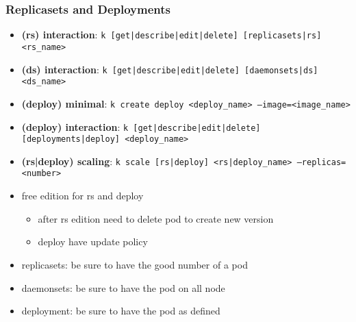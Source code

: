 \subsubsection{Replicasets and Deployments}
\begin{frame}[fragile]{\subsubsecname}

  \begin{itemize}
    \item \textbf{(rs) interaction}: \texttt{k [get|describe|edit|delete] [replicasets|rs] <rs\_name>}
    \item \textbf{(ds) interaction}: \texttt{k [get|describe|edit|delete] [daemonsets|ds] <ds\_name>}
    \item \textbf{(deploy) minimal}: \texttt{k create deploy <deploy\_name> --image=<image\_name>}
    \item \textbf{(deploy) interaction}: \texttt{k [get|describe|edit|delete] [deployments|deploy] <deploy\_name>}
    \item \textbf{(rs|deploy) scaling}: \texttt{k scale [rs|deploy] <rs|deploy\_name> --replicas=<number>}
    \item free edition for rs and deploy
    \begin{itemize}
      \item after rs edition need to delete pod to create new version
      \item deploy have update policy
    \end{itemize}
    \item replicasets: be sure to have the good number of a pod
    \item daemonsets: be sure to have the pod on all node
    \item deployment: be sure to have the pod as defined
  \end{itemize}
  
\end{frame}
